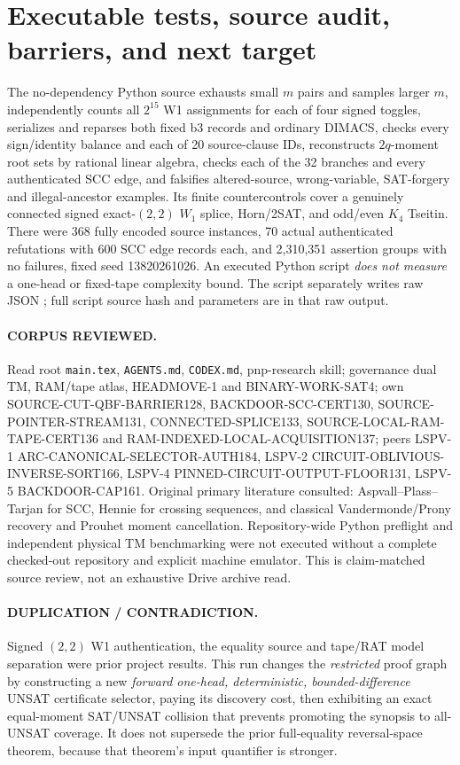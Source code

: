 \documentclass[11pt]{article}
\begin{document}
\section{Executable tests, source audit, barriers, and next target}
The no-dependency Python source  exhausts small $m$ pairs and samples larger $m$, independently counts all $2^{15}$ W1 assignments for each of four signed toggles, serializes and reparses both fixed b3 records and ordinary DIMACS, checks every sign/identity balance and each of 20 source-clause IDs, reconstructs $2q$-moment root sets by rational linear algebra, checks each of the 32 branches and every authenticated SCC edge, and falsifies altered-source, wrong-variable, SAT-forgery and illegal-ancestor examples. Its finite countercontrols cover a genuinely connected signed exact-$(2,2)$ $W_1$ splice, Horn/2SAT, and odd/even $K_4$ Tseitin. There were 368 fully encoded source instances, 70 actual authenticated refutations with 600 SCC edge records each, and 2,310,351 assertion groups with no failures, fixed seed 13820261026. An executed Python script \emph{does not measure} a one-head or fixed-tape complexity bound. The script separately writes raw JSON ; full script source hash and parameters are in that raw output.

\paragraph{CORPUS REVIEWED.} Read root \texttt{main.tex}, \texttt{AGENTS.md}, \texttt{CODEX.md}, pnp-research skill; governance dual TM, RAM/tape atlas, HEADMOVE-1 and BINARY-WORK-SAT4; own SOURCE-CUT-QBF-BARRIER128, BACKDOOR-SCC-CERT130, SOURCE-POINTER-STREAM131, CONNECTED-SPLICE133, SOURCE-LOCAL-RAM-TAPE-CERT136 and RAM-INDEXED-LOCAL-ACQUISITION137; peers LSPV-1 ARC-CANONICAL-SELECTOR-AUTH184, LSPV-2 CIRCUIT-OBLIVIOUS-INVERSE-SORT166, LSPV-4 PINNED-CIRCUIT-OUTPUT-FLOOR131, LSPV-5 BACKDOOR-CAP161. Original primary literature consulted: Aspvall--Plass--Tarjan for SCC, Hennie for crossing sequences, and classical Vandermonde/Prony recovery and Prouhet moment cancellation. Repository-wide Python preflight and independent physical TM benchmarking were not executed without a complete checked-out repository and explicit machine emulator. This is claim-matched source review, not an exhaustive Drive archive read.
\paragraph{DUPLICATION / CONTRADICTION.} Signed $(2,2)$ W1 authentication, the equality source and tape/RAT model separation were prior project results. This run changes the \emph{restricted} proof graph by constructing a new \emph{forward one-head, deterministic, bounded-difference} UNSAT certificate selector, paying its discovery cost, then exhibiting an exact equal-moment SAT/UNSAT collision that prevents promoting the synopsis to all-UNSAT coverage. It does not supersede the prior full-equality reversal-space theorem, because that theorem's input quantifier is stronger.
\end{document}
